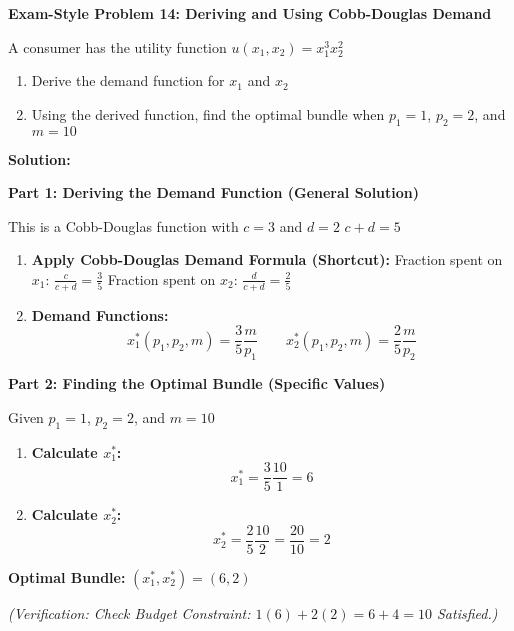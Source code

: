 \documentclass{article}
\begin{document}
\vspace{0.5em}

\noindent\textbf{Exam-Style Problem 14: Deriving and Using Cobb-Douglas Demand}
\vspace{0.5em}

\noindent A consumer has the utility function $u(x_1, x_2) = x_1^3 x_2^2$
\begin{enumerate}
    \item Derive the demand function for $x_1$ and $x_2$
    \item Using the derived function, find the optimal bundle when $p_1=1$, $p_2=2$, and $m=10$
\end{enumerate}

\vspace{1em}
\noindent\textbf{Solution:}
\vspace{0.5em}

\noindent\textbf{Part 1: Deriving the Demand Function (General Solution)}
\vspace{0.5em}

\noindent This is a Cobb-Douglas function with $c=3$ and $d=2$ $c+d = 5$
\begin{enumerate}
    \item \textbf{Apply Cobb-Douglas Demand Formula (Shortcut):} Fraction spent on $x_1$: $\frac{c}{c+d} = \frac{3}{5}$ Fraction spent on $x_2$: $\frac{d}{c+d} = \frac{2}{5}$
    \item \textbf{Demand Functions:} \[ x_1^*(p_1, p_2, m) = \frac{3}{5} \frac{m}{p_1} \qquad x_2^*(p_1, p_2, m) = \frac{2}{5} \frac{m}{p_2} \]
\end{enumerate}

\vspace{0.5em}
\noindent\textbf{Part 2: Finding the Optimal Bundle (Specific Values)}
\vspace{0.5em}

\noindent Given $p_1=1$, $p_2=2$, and $m=10$
\begin{enumerate}
    \item \textbf{Calculate $x_1^*$:} \[ x_1^* = \frac{3}{5} \frac{10}{1} = 6 \]
    \item \textbf{Calculate $x_2^*$:} \[ x_2^* = \frac{2}{5} \frac{10}{2} = \frac{20}{10} = 2 \]
\end{enumerate}

\noindent\textbf{Optimal Bundle:} $(x_1^*, x_2^*) = (6, 2)$

\vspace{0.5em}
\noindent\textit{(Verification: Check Budget Constraint: $1(6) + 2(2) = 6 + 4 = 10$ Satisfied.)}
\end{document}
